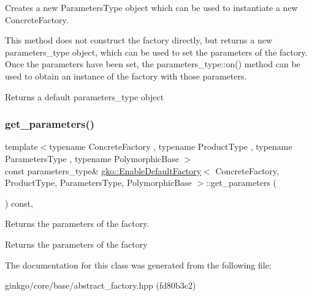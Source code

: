 Creates a new Parameters\+Type object which can be used to instantiate a new Concrete\+Factory. 

This method does not construct the factory directly, but returns a new parameters\+\_\+type object, which can be used to set the parameters of the factory. Once the parameters have been set, the parameters\+\_\+type\+::on() method can be used to obtain an instance of the factory with those parameters.

\begin{DoxyReturn}{Returns}
a default parameters\+\_\+type object 
\end{DoxyReturn}
\mbox{\label{classgko_1_1EnableDefaultFactory_ae32f2b3100640293f3a46e1280965162}} 
\subsubsection{\texorpdfstring{get\+\_\+parameters()}{get\_parameters()}}
{\footnotesize\ttfamily template$<$typename Concrete\+Factory , typename Product\+Type , typename Parameters\+Type , typename Polymorphic\+Base $>$ \\
const parameters\+\_\+type\& \hyperlink{classgko_1_1EnableDefaultFactory}{gko\+::\+Enable\+Default\+Factory}$<$ Concrete\+Factory, Product\+Type, Parameters\+Type, Polymorphic\+Base $>$\+::get\+\_\+parameters (\begin{DoxyParamCaption}{ }\end{DoxyParamCaption}) const\hspace{0.3cm}{\ttfamily [inline]}, {\ttfamily [noexcept]}}



Returns the parameters of the factory. 

\begin{DoxyReturn}{Returns}
the parameters of the factory 
\end{DoxyReturn}


The documentation for this class was generated from the following file\+:\begin{DoxyCompactItemize}
\item 
ginkgo/core/base/abstract\+\_\+factory.\+hpp (fd80b3c2)\end{DoxyCompactItemize}
